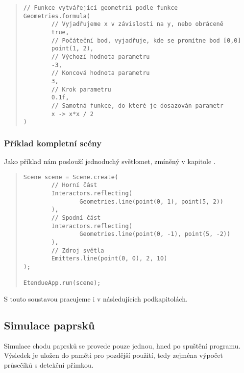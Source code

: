 \begin{minipage}{\textwidth}\begin{quote}\begin{lstlisting}
// Funkce vytvářející geometrii podle funkce
Geometries.formula(
        // Vyjadřujeme x v závislosti na y, nebo obráceně
        true,
        // Počáteční bod, vyjadřuje, kde se promítne bod [0,0]
        point(1, 2),
        // Výchozí hodnota parametru
        -3,
        // Koncová hodnota parametru
        3,
        // Krok parametru
        0.1f,
        // Samotná funkce, do které je dosazován parametr
        x -> x*x / 2
)
\end{lstlisting}\end{quote}\end{minipage}


\subsubsection{Příklad kompletní scény}

Jako příklad nám poslouží jednoduchý světlomet, zmíněný v kapitole .

\begin{minipage}{\textwidth}\begin{quote}\begin{lstlisting}
Scene scene = Scene.create(
        // Horní část
        Interactors.reflecting(
                Geometries.line(point(0, 1), point(5, 2))
        ),
        // Spodní část
        Interactors.reflecting(
                Geometries.line(point(0, -1), point(5, -2))
        ),
        // Zdroj světla
        Emitters.line(point(0, 0), 2, 10)
);

EtendueApp.run(scene);
\end{lstlisting}\end{quote}\end{minipage}

S touto soustavou pracujeme i v následujících podkapitolách.


\subsection{Simulace paprsků}
\label{sub:architekturaaplikace_simulacepaprsku}

Simulace chodu paprsků se provede pouze jednou, hned po spuštění programu. Výsledek je uložen do paměti pro pozdější použití, tedy zejména výpočet průsečíků s detekční přímkou.


